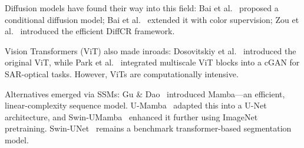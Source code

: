 Diffusion models have found their way into this field: Bai et al.~\cite{bai2023} proposed a conditional diffusion model; Bai et al.~\cite{bai2024} extended it with color supervision; Zou et al.~\cite{zou2023} introduced the efficient DiffCR framework.

Vision Transformers (ViT) also made inroads: Dosovitskiy et al.~\cite{dosovitskiy2020} introduced the original ViT, while Park et al.~\cite{park2025} integrated multiscale ViT blocks into a cGAN for SAR-optical tasks. However, ViTs are computationally intensive.

Alternatives emerged via SSMs: Gu \& Dao~\cite{gu2023} introduced Mamba—an efficient, linear-complexity sequence model. U-Mamba~\cite{umamba2024} adapted this into a U-Net architecture, and Swin-UMamba~\cite{swinumamba2024} enhanced it further using ImageNet pretraining. Swin-UNet~\cite{swinunet2023} remains a benchmark transformer-based segmentation model. 
